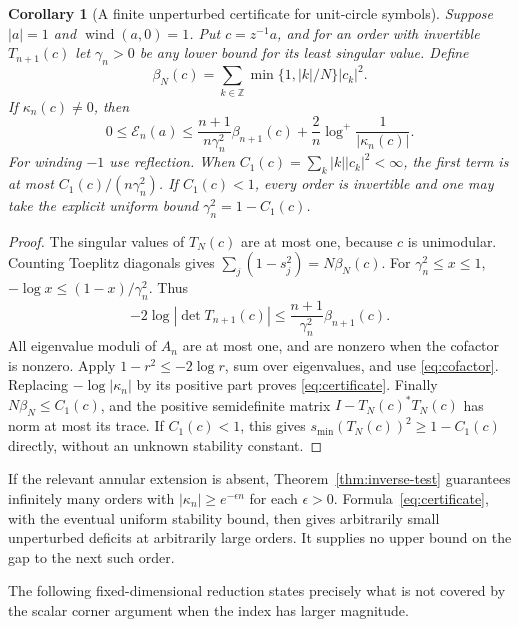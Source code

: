 \documentclass[11pt]{article}
\newtheorem{corollary}[theorem]{Corollary}
\theoremstyle{definition}
\newcommand{\E}{\mathcal E}
\newcommand{\wind}{\operatorname{wind}}
\begin{document}
\begin{corollary}[A finite unperturbed certificate for unit-circle symbols]\label{cor:certificate}
Suppose $|a|=1$ and $\wind(a,0)=1$. Put $c=z^{-1}a$, and for an order with invertible $T_{n+1}(c)$ let $\gamma_n>0$ be any lower bound for its least singular value. Define
\[
 \beta_N(c)=\sum_{k\in\mathbb Z}\min\{1,|k|/N\}|c_k|^2.
\]
If $\kappa_n(c)\ne0$, then
\begin{equation}
 0\le\E_n(a)\le
 \frac{n+1}{n\gamma_n^2}\beta_{n+1}(c)
 +\frac2n\log^+\frac1{|\kappa_n(c)|}.
 \label{eq:certificate}
\end{equation}
For winding $-1$ use reflection. When $C_1(c)=\sum_k|k||c_k|^2<\infty$, the first term is at most $C_1(c)/(n\gamma_n^2)$. If $C_1(c)<1$, every order is invertible and one may take the explicit uniform bound $\gamma_n^2=1-C_1(c)$.
\end{corollary}
\begin{proof}
The singular values of $T_N(c)$ are at most one, because $c$ is unimodular. Counting Toeplitz diagonals gives
$\sum_j(1-s_j^2)=N\beta_N(c)$. For $\gamma_n^2\le x\le1$, $-\log x\le(1-x)/\gamma_n^2$. Thus
\[
 -2\log|\det T_{n+1}(c)|\le
 \frac{n+1}{\gamma_n^2}\beta_{n+1}(c).
\]
All eigenvalue moduli of $A_n$ are at most one, and are nonzero when the cofactor is nonzero. Apply $1-r^2\le-2\log r$, sum over eigenvalues, and use \eqref{eq:cofactor}. Replacing $-\log|\kappa_n|$ by its positive part proves \eqref{eq:certificate}. Finally $N\beta_N\le C_1(c)$, and the positive semidefinite matrix $I-T_N(c)^*T_N(c)$ has norm at most its trace. If $C_1(c)<1$, this gives $s_{\min}(T_N(c))^2\ge1-C_1(c)$ directly, without an unknown stability constant.
\end{proof}

If the relevant annular extension is absent, Theorem~\ref{thm:inverse-test} guarantees infinitely many orders with $|\kappa_n|\ge e^{-\epsilon n}$ for each $\epsilon>0$. Formula~\eqref{eq:certificate}, with the eventual uniform stability bound, then gives arbitrarily small unperturbed deficits at arbitrarily large orders. It supplies no upper bound on the gap to the next such order.

The following fixed-dimensional reduction states precisely what is not covered by the scalar corner argument when the index has larger magnitude.
\end{document}
